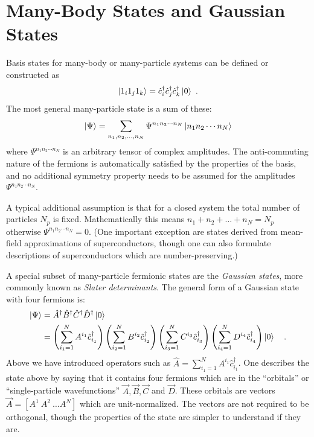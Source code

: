 \documentclass[aps, superscriptaddress, floatfix, onecolumn]{revtex4-2}
\begin{document}
\section{Many-Body States and Gaussian States}

Basis states for many-body or many-particle systems can be defined or constructed as
\begin{align}
\ket{1_i 1_j 1_k} = \hat{c}^\dagger_i \hat{c}^\dagger_j \hat{c}^\dagger_k \ket{0} \ .
\end{align}
The most general many-particle state is a sum of these:
\begin{align}
\ket{\Psi} = \sum_{n_1, n_2, \ldots, n_N} \Psi^{n_1 n_2 \cdots n_N} \ket{n_1 n_2 \cdots n_N} \label{eqn:general_state}
\end{align}
where $\Psi^{n_1 n_2 \cdots n_N}$ is an arbitrary tensor of complex amplitudes. The anti-commuting nature of the fermions is automatically satisfied by the properties of the basis, and no additional symmetry property needs to be assumed for the amplitudes $\Psi^{n_1 n_2 \cdots n_N}$. 

A typical additional assumption is that for a closed system the total number of particles $N_p$ is fixed. Mathematically this means $n_1 + n_2 + \ldots + n_N = N_p$ otherwise $\Psi^{n_1 n_2 \cdots n_N} = 0$. (One important exception are states derived from mean-field approximations of superconductors, though one can also formulate descriptions of superconductors which are number-preserving.)

A special subset of many-particle fermionic states are the \emph{Gaussian states}, more commonly known as \emph{Slater determinants}.
The general form of a Gaussian state with four fermions is:
\begin{align}
\ket{\Psi} & = \hat{A}^\dagger \hat{B}^\dagger \hat{C}^\dagger \hat{D}^\dagger \ket{0} \nonumber \\
& = \left( \sum_{i_1=1}^N A^{i_1} \hat{c}^\dagger_{i_1} \right) \left( \sum_{i_2=1}^N B^{i_2} \hat{c}^\dagger_{i_2} \right) \left( \sum_{i_3=1}^N C^{i_3} \hat{c}^\dagger_{i_3} \right) \left( \sum_{i_4=1}^N D^{i_4} \hat{c}^\dagger_{i_4} \right) \ket{0} \ \ \ .
\end{align}
Above we have introduced operators such as $\hat{A} =  \sum_{i_1=1}^N A^{i_1} \hat{c}^\dagger_{i_1}$. One describes the state above by saying that it contains four fermions which are in the ``orbitals'' or ``single-particle wavefunctions'' $\vec{A}, \vec{B}, \vec{C}$ and $\vec{D}$. These orbitals are vectors $\vec{A}= [A^1 \ A^2 \ \ldots A^N]$ which are unit-normalized. The vectors are not required to be orthogonal, though the properties of the state are simpler to understand if they are.
\end{document}
